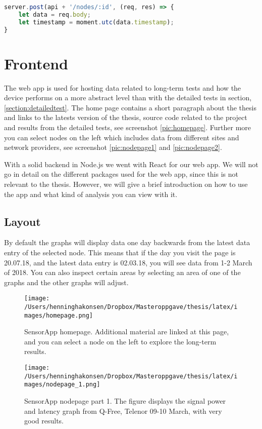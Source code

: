 \documentclass[USenglish]{ifimaster}  %
\begin{document}
\begin{lstlisting}[caption={Simple moment example},label={code:moment},language=JavaScript]
server.post(api + '/nodes/:id', (req, res) => {
    let data = req.body;
    let timestamp = moment.utc(data.timestamp);
}
\end{lstlisting}

\section{Frontend}
The web app is used for hosting data related to long-term tests and how the device performs on a more abstract level than with the detailed tests in section, \vref{section:detailedtest}. The home page contains a short paragraph about the thesis and links to the latests version of the thesis, source code related to the project and results from the detailed tests, see screenshot \vref{pic:homepage}. Further more you can select nodes on the left which includes data from different sites and network providers, see screenshot \vref{pic:nodepage1} and \vref{pic:nodepage2}.

With a solid backend in Node.js we went with React for our web app. We will not go in detail on the different packages used for the web app, since this is not relevant to the thesis. However, we will give a brief introduction on how to use the app and what kind of analysis you can view with it.

\subsection{Layout} \label{sssection:layout}
By default the graphs will display data one day backwards from the latest data entry of the selected node. This means that if the day you visit the page is 20.07.18, and the latest data entry is 02.03.18, you will see data from 1-2 March of 2018. You can also inspect certain areas by selecting an area of one of the graphs and the other graphs will adjust.

\begin{figure}[H]
  \centering
  \texttt{[image: /Users/henninghakonsen/Dropbox/Masteroppgave/thesis/latex/images/homepage.png]}
  \caption[SensorApp homepage]{SensorApp homepage. Additional material are linked at this page, and you can select a node on the left to explore the long-term results.}
  \label{pic:homepage}
\end{figure}

\begin{figure}[H]
  \centering
  \texttt{[image: /Users/henninghakonsen/Dropbox/Masteroppgave/thesis/latex/images/nodepage\_1.png]}
  \caption[SensorApp nodepage part 1]{SensorApp nodepage part 1. The figure displays the signal power and latency graph from Q-Free, Telenor 09-10 March, with very good results.}
  \label{pic:nodepage1}
\end{figure}
\end{document}
